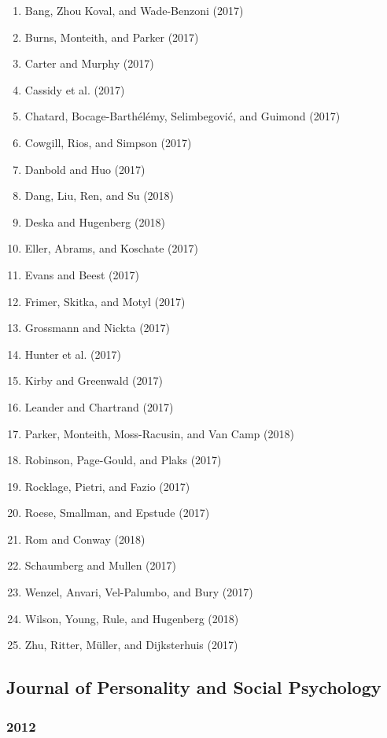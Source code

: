 \documentclass[english,man]{apa6}
\providecommand{\tightlist}{%
  \setlength{\itemsep}{0pt}\setlength{\parskip}{0pt}}
\theoremstyle{definition}
\theoremstyle{definition}
\theoremstyle{definition}
\theoremstyle{remark}
\begin{document}
\begin{enumerate}
\def\labelenumi{\arabic{enumi})}
\tightlist
\item
  Bang, Zhou Koval, and Wade-Benzoni (2017)
\item
  Burns, Monteith, and Parker (2017)
\item
  Carter and Murphy (2017)
\item
  Cassidy et al. (2017)
\item
  Chatard, Bocage-Barthélémy, Selimbegović, and Guimond (2017)
\item
  Cowgill, Rios, and Simpson (2017)
\item
  Danbold and Huo (2017)
\item
  Dang, Liu, Ren, and Su (2018)
\item
  Deska and Hugenberg (2018)
\item
  Eller, Abrams, and Koschate (2017)
\item
  Evans and Beest (2017)
\item
  Frimer, Skitka, and Motyl (2017)
\item
  Grossmann and Nickta (2017)
\item
  Hunter et al. (2017)
\item
  Kirby and Greenwald (2017)
\item
  Leander and Chartrand (2017)
\item
  Parker, Monteith, Moss-Racusin, and Van Camp (2018)
\item
  Robinson, Page-Gould, and Plaks (2017)
\item
  Rocklage, Pietri, and Fazio (2017)
\item
  Roese, Smallman, and Epstude (2017)
\item
  Rom and Conway (2018)
\item
  Schaumberg and Mullen (2017)
\item
  Wenzel, Anvari, Vel-Palumbo, and Bury (2017)
\item
  Wilson, Young, Rule, and Hugenberg (2018)
\item
  Zhu, Ritter, Müller, and Dijksterhuis (2017)
\end{enumerate}

\subsection{Journal of Personality and Social
Psychology}\label{journal-of-personality-and-social-psychology}

\subsubsection{2012}\label{section-48}
\end{document}
